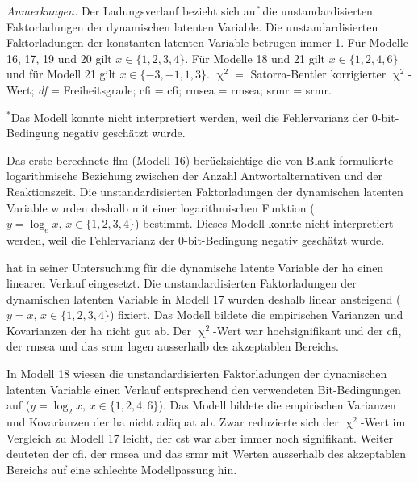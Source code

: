 \documentclass[11pt, twoside, a4paper]{book}		%
\begin{document}
\begin{table}[htb]
\begin{adjustbox}{width=1\textwidth, keepaspectratio}
\begin{threeparttable}
{\begin{tabular}
					
				\end{tabular}%
			}
			\begin{tablenotes}[flushleft]
				\footnotesize				%
				\setlength{}	%
				\item \textit{Anmerkungen.} Der Ladungsverlauf bezieht sich auf die unstandardisierten Faktorladungen der dynamischen latenten Variable. Die unstandardisierten Faktorladungen der konstanten latenten Variable betrugen immer 1. Für Modelle 16, 17, 19 und 20 gilt $x\in\{1,2,3,4\}$. Für Modelle 18 und 21 gilt $x\in\{1,2,4,6\}$ und für Modell 21 gilt $x\in\{-3,-1,1,3\}$. $\upchi^2 =$ Satorra-Bentler \citeyearpar{Satorra1994} korrigierter $\upchi^2$-Wert; \textit{df} = Freiheitsgrade; \gls{cfi} = \acrlong{cfi}; \gls{rmsea} = \acrlong{rmsea}; \gls{srmr} = \acrlong{srmr}.
				\item {$^{*}$}Das Modell konnte nicht interpretiert werden, weil die Fehlervarianz der 0-bit-Bedingung negativ geschätzt wurde.
			\end{tablenotes}%
		\end{threeparttable}
	\end{adjustbox}	
\end{table}

Das erste berechnete \gls{flm} (Modell 16) berücksichtige die von Blank \citep[1934; zitiert nach][S. 11]{Hick1952} formulierte logarithmische Beziehung zwischen der Anzahl Antwortalternativen und der Reaktionszeit. Die unstandardisierten Faktorladungen der dynamischen latenten Variable wurden deshalb mit einer logarithmischen Funktion ($y=\log_{e}x,\,x\in\{1, 2, 3, 4\}$) bestimmt. Dieses Modell konnte nicht interpretiert werden, weil die Fehlervarianz der 0-bit-Bedingung negativ geschätzt wurde.

\citet{Schweizer2006b} hat in seiner Untersuchung für die dynamische latente Variable der \gls{ha} einen linearen Verlauf eingesetzt. 
Die unstandardisierten Faktorladungen der dynamischen latenten Variable in Modell 17 wurden deshalb linear ansteigend ($y=x,\,x\in\{1, 2, 3, 4\}$) fixiert. Das Modell bildete die empirischen Varianzen und Kovarianzen der \gls{ha} nicht gut ab. Der $\upchi^2$-Wert war hochsignifikant und der \gls{cfi}, der \gls{rmsea} und das \gls{srmr} lagen ausserhalb des akzeptablen Bereichs.

In Modell 18 wiesen die unstandardisierten Faktorladungen der dynamischen latenten Variable einen Verlauf entsprechend den verwendeten Bit-Bedingungen auf ($y=\log_{2}x,\,x\in\{1, 2, 4, 6\}$). Das Modell bildete die empirischen Varianzen und Kovarianzen der \gls{ha} nicht adäquat ab. Zwar reduzierte sich der $\upchi^2$-Wert im Vergleich zu Modell 17 leicht, der \gls{cst} war aber immer noch signifikant. Weiter deuteten der \gls{cfi}, der \gls{rmsea} und das \gls{srmr} mit Werten ausserhalb des akzeptablen Bereichs auf eine schlechte Modellpassung hin.
\end{document}
